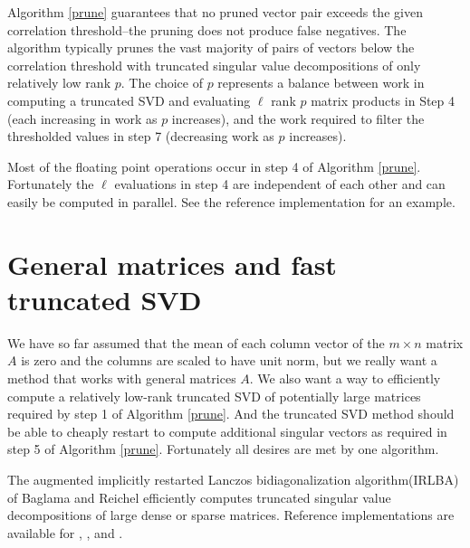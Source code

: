 \documentclass[article]{jss}
\numberwithin{algorithmctr}{section}
\begin{document}
Algorithm \ref{prune} guarantees that no pruned vector pair exceeds the given
correlation threshold--the pruning does not produce false negatives.  The
algorithm typically prunes the vast majority of pairs of vectors below the
correlation threshold with truncated singular value decompositions of only
relatively low rank $p$.  The choice of $p$ represents a balance between work
in computing a truncated SVD and evaluating $\ell$ rank $p$ matrix products in
Step 4 (each increasing in work as $p$ increases), and the work required to
filter the thresholded values in step 7 (decreasing work as $p$ increases).

Most of the floating point operations occur in step 4 of Algorithm \ref{prune}.
Fortunately the $\ell$ evaluations in step 4 are independent of each other and
can easily be computed in parallel. See the reference 
implementation \citep{sup} for an example.


\section{General matrices and fast truncated SVD}\label{irlba}

We have so far assumed that the mean of each column vector of the $m\times n$
matrix $A$ is zero and the columns are scaled to have unit norm, but we really
want a method that works with general matrices $A$.  We also want a way to
efficiently compute a relatively low-rank truncated SVD of potentially large
matrices required by step 1 of Algorithm \ref{prune}.  And the truncated SVD
method should be able to cheaply restart to compute additional singular vectors
as required in step 5 of Algorithm \ref{prune}. Fortunately all desires are met
by one algorithm.

The augmented implicitly restarted Lanczos bidiagonalization algorithm\break(IRLBA)
of Baglama and Reichel \citep{irlba} efficiently computes truncated singular value
decompositions of large dense or sparse matrices. Reference implementations are
available for  \citep{irlbar},  \citep{irlbam},
and  \citep{irlbap}.
\end{document}

